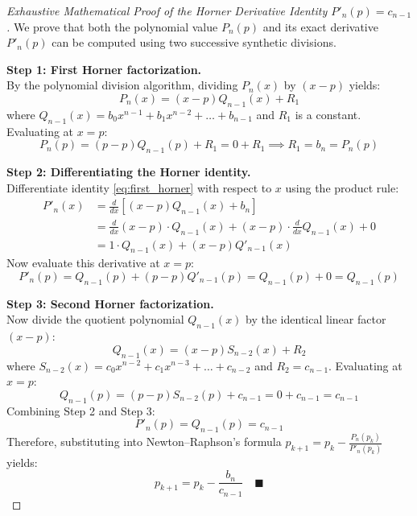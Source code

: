 \begin{proof}[Exhaustive Mathematical Proof of the Horner Derivative Identity $P'_n(p) = c_{n-1}$]
We prove that both the polynomial value $P_n(p)$ and its exact derivative $P'_n(p)$ can be computed using two successive synthetic divisions.

\medskip
\noindent\textbf{Step 1: First Horner factorization.} \\
By the polynomial division algorithm, dividing $P_n(x)$ by $(x - p)$ yields:
\begin{equation}
    \label{eq:first_horner}
    P_n(x) = (x - p) Q_{n-1}(x) + R_1
\end{equation}
where $Q_{n-1}(x) = b_0 x^{n-1} + b_1 x^{n-2} + \dots + b_{n-1}$ and $R_1$ is a constant. Evaluating at $x = p$:
\begin{equation}
    P_n(p) = (p - p) Q_{n-1}(p) + R_1 = 0 + R_1 \implies R_1 = b_n = P_n(p)
\end{equation}

\noindent\textbf{Step 2: Differentiating the Horner identity.} \\
Differentiate identity \eqref{eq:first_horner} with respect to $x$ using the product rule:
\begin{align}
    P'_n(x) &= \frac{d}{dx}\left[ (x - p) Q_{n-1}(x) + b_n \right] \nonumber \\
    &= \frac{d}{dx}(x - p) \cdot Q_{n-1}(x) + (x - p) \cdot \frac{d}{dx} Q_{n-1}(x) + 0 \nonumber \\
    &= 1 \cdot Q_{n-1}(x) + (x - p) Q'_{n-1}(x)
\end{align}
Now evaluate this derivative at $x = p$:
\begin{equation}
    P'_n(p) = Q_{n-1}(p) + (p - p) Q'_{n-1}(p) = Q_{n-1}(p) + 0 = \boxed{Q_{n-1}(p)}
\end{equation}

\noindent\textbf{Step 3: Second Horner factorization.} \\
Now divide the quotient polynomial $Q_{n-1}(x)$ by the identical linear factor $(x - p)$:
\begin{equation}
    Q_{n-1}(x) = (x - p) S_{n-2}(x) + R_2
\end{equation}
where $S_{n-2}(x) = c_0 x^{n-2} + c_1 x^{n-3} + \dots + c_{n-2}$ and $R_2 = c_{n-1}$.
Evaluating at $x = p$:
\begin{equation}
    Q_{n-1}(p) = (p - p) S_{n-2}(p) + c_{n-1} = 0 + c_{n-1} = c_{n-1}
\end{equation}
Combining Step 2 and Step 3:
\begin{equation}
    \boxed{P'_n(p) = Q_{n-1}(p) = c_{n-1}}
\end{equation}
Therefore, substituting into Newton--Raphson's formula $p_{k+1} = p_k - \frac{P_n(p_k)}{P'_n(p_k)}$ yields:
\begin{equation}
    p_{k+1} = p_k - \frac{b_n}{c_{n-1}} \quad \blacksquare
\end{equation}
\end{proof}


